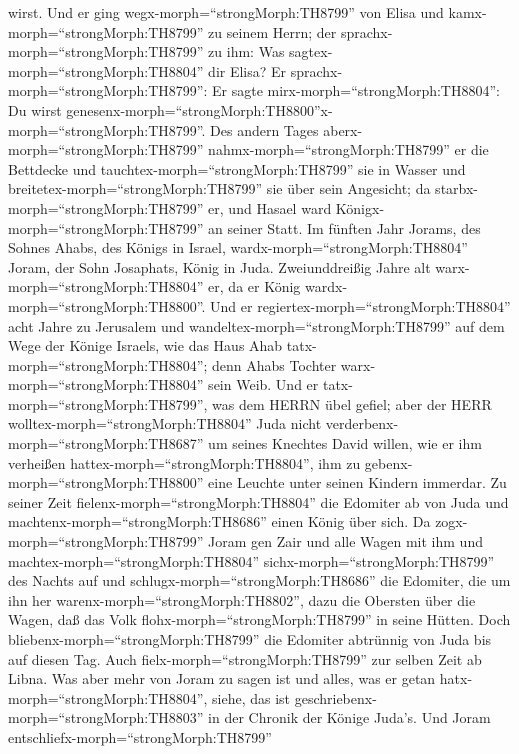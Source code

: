 wirst.  Und er ging wegx-morph=``strongMorph:TH8799'' von
Elisa und kamx-morph=``strongMorph:TH8799'' zu seinem Herrn; der
sprachx-morph=``strongMorph:TH8799'' zu ihm: Was
sagtex-morph=``strongMorph:TH8804'' dir Elisa? Er
sprachx-morph=``strongMorph:TH8799'': Er sagte
mirx-morph=``strongMorph:TH8804'': Du wirst
genesenx-morph=``strongMorph:TH8800''x-morph=``strongMorph:TH8799''.
 Des andern Tages aberx-morph=``strongMorph:TH8799''
nahmx-morph=``strongMorph:TH8799'' er die Bettdecke und
tauchtex-morph=``strongMorph:TH8799'' sie in Wasser und
breitetex-morph=``strongMorph:TH8799'' sie über sein Angesicht; da
starbx-morph=``strongMorph:TH8799'' er, und Hasael ward
Königx-morph=``strongMorph:TH8799'' an seiner Statt.  Im
fünften Jahr Jorams, des Sohnes Ahabs, des Königs in Israel,
wardx-morph=``strongMorph:TH8804'' Joram, der Sohn Josaphats, König in
Juda.  Zweiunddreißig Jahre alt
warx-morph=``strongMorph:TH8804'' er, da er König
wardx-morph=``strongMorph:TH8800''. Und er
regiertex-morph=``strongMorph:TH8804'' acht Jahre zu Jerusalem
 und wandeltex-morph=``strongMorph:TH8799'' auf dem Wege
der Könige Israels, wie das Haus Ahab tatx-morph=``strongMorph:TH8804'';
denn Ahabs Tochter warx-morph=``strongMorph:TH8804'' sein Weib. Und er
tatx-morph=``strongMorph:TH8799'', was dem HERRN übel gefiel;
 aber der HERR wolltex-morph=``strongMorph:TH8804'' Juda
nicht verderbenx-morph=``strongMorph:TH8687'' um seines Knechtes David
willen, wie er ihm verheißen hattex-morph=``strongMorph:TH8804'', ihm zu
gebenx-morph=``strongMorph:TH8800'' eine Leuchte unter seinen Kindern
immerdar.  Zu seiner Zeit
fielenx-morph=``strongMorph:TH8804'' die Edomiter ab von Juda und
machtenx-morph=``strongMorph:TH8686'' einen König über sich.
 Da zogx-morph=``strongMorph:TH8799'' Joram gen Zair und
alle Wagen mit ihm und machtex-morph=``strongMorph:TH8804''
sichx-morph=``strongMorph:TH8799'' des Nachts auf und
schlugx-morph=``strongMorph:TH8686'' die Edomiter, die um ihn her
warenx-morph=``strongMorph:TH8802'', dazu die Obersten über die Wagen,
daß das Volk flohx-morph=``strongMorph:TH8799'' in seine Hütten.
 Doch bliebenx-morph=``strongMorph:TH8799'' die Edomiter
abtrünnig von Juda bis auf diesen Tag. Auch
fielx-morph=``strongMorph:TH8799'' zur selben Zeit ab Libna.
 Was aber mehr von Joram zu sagen ist und alles, was er
getan hatx-morph=``strongMorph:TH8804'', siehe, das ist
geschriebenx-morph=``strongMorph:TH8803'' in der Chronik der Könige
Juda's.  Und Joram entschliefx-morph=``strongMorph:TH8799''
